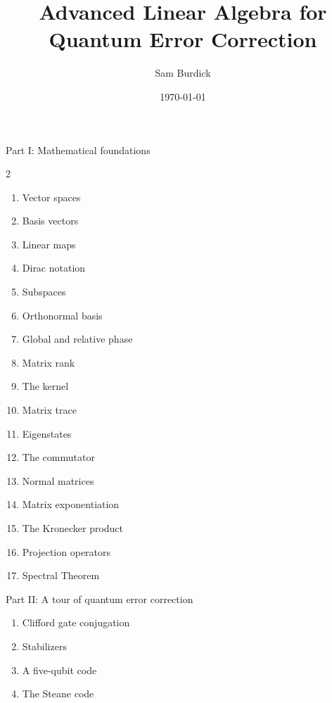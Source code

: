 \documentclass{beamer}
\title{Advanced Linear Algebra for\\Quantum Error Correction}
\author{Sam Burdick}
\institute{Topological Quantum Error Correction}
\date{\today}
\begin{document}
\frame{\titlepage}

\begin{frame}{Part I: Mathematical foundations}
\begin{multicols}{2}
    \begin{enumerate}
    \item Vector spaces
    \item Basis vectors
    \item Linear maps
    \item Dirac notation
    \item Subspaces
    \item Orthonormal basis
    \item Global and relative phase
    \item Matrix rank
    \item The kernel
    \item Matrix trace
    \item Eigenstates
    \item The commutator
    \item Normal matrices
    \item Matrix exponentiation
    \item The Kronecker product
    \item Projection operators
    \item Spectral Theorem
    \end{enumerate}
\end{multicols}
\end{frame}

\begin{frame}{Part II: A tour of quantum error correction}
\begin{enumerate}
    \item Clifford gate conjugation
    \item Stabilizers
    \item A five-qubit code
    \item The Steane code
\end{enumerate}
\end{frame}

\end{document}
